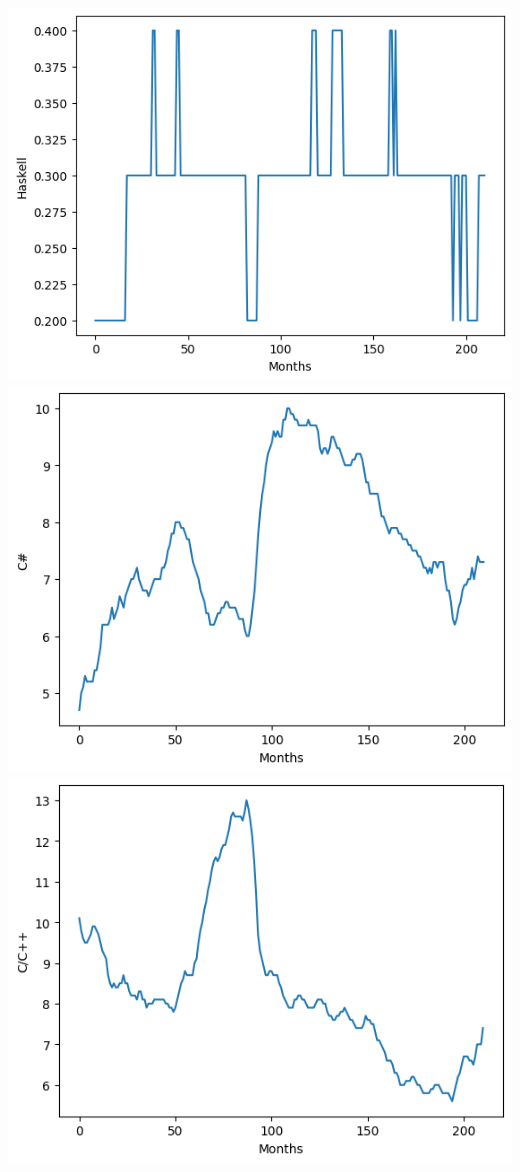 \documentclass[conference]{IEEEtran}
\begin{document}
\includegraphics[scale=0.4]{lineplot/haskell.png}
\includegraphics[scale=0.4]{lineplot/c-sharp.png}
\includegraphics[scale=0.4]{lineplot/ccpp.png}
\end{document}
